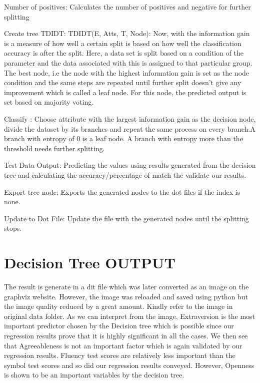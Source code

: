 \documentclass[a4paper,11pt,english]{sphinxmanual}
\begin{document}
Number of positives: Calculates the number of positives and negative for further splitting

Create tree TDIDT: TDIDT(E, Atts, T, Node): Now, with the information gain is a measure of how well a certain split is based on how well the classification accuracy is after the split. Here, a data set is split based on a condition of the parameter and the data associated with this is assigned to that particular group. The best node, i.e the node with the highest information gain is set as the node condition and the same steps are repeated until further split doesn’t give any improvement which is called a leaf node. For this node, the predicted output is set based on majority voting.

Classify :
Choose attribute with the largest information gain as the decision node, divide the dataset by its branches and repeat the same process on every branch.A branch with entropy of 0 is a leaf node. A branch with entropy more than the threshold needs further splitting.

Test Data Output: Predicting the values using results generated from the decision tree and calculating the accuracy/percentage of match the validate our results.

Export tree node: Exports the generated nodes to the dot files if the index is none.

Update to Dot File: Update the file with the generated nodes until the splitting stops.


\section{Decision Tree OUTPUT}
\label{\detokenize{analysis:decision-tree-output}}
The result is generate in a dit file which was later converted as an image on the graphviz website. However, the image was reloaded and saved using python but the image quality reduced by a great amount.
Kindly refer to the image in original data folder. As we can interpret from the image, Extraversion is the most important predictor chosen by the Decision tree which is possible since our regression results prove that it is highly significant in all the cases. We then see that Agreeableness is not an important factor which is again validated by our regression results. Fluency test scores are relatively less important than the symbol test scores and so did our regression results conveyed. However, Openness is shown to be an important variables by the decision tree.
\end{document}
